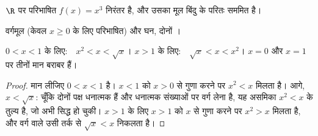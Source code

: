 \begin{proposition}[घन फलन]\label{prop:g10:reffunc:cube}
$\R$ पर परिभाषित  $f(x) = x^3$ निरंतर  है, और उसका  मूल बिंदु के
परितः सममित है।
\end{proposition}
\admitted

\begin{omfigure}
\hfill
{}

{\small वर्गमूल (केवल $x \geq 0$ के लिए परिभाषित) और घन, दोनों ।}
\end{omfigure}

\begin{proposition}[$x$, $x^2$ और $\sqrt x$ की तुलना]\label{prop:g10:reffunc:compare}
$0 < x < 1$ के लिए:\ \ $x^2 < x < \sqrt x$।\quad
$x > 1$ के लिए:\ \ $\sqrt x < x < x^2$।\quad
$x = 0$ और $x = 1$ पर तीनों मान बराबर हैं।
\end{proposition}

\begin{proof}
मान लीजिए $0 < x < 1$ है। $x < 1$ को $x > 0$ से गुणा करने पर $x^2 < x$ मिलता है। आगे,
$x < \sqrt x$: चूँकि दोनों पक्ष धनात्मक हैं और धनात्मक संख्याओं पर वर्ग लेना 
है, यह असमिका $x^2 < x$ के तुल्य है, जो अभी सिद्ध हो चुकी। $x > 1$ के लिए $x > 1$
को $x$ से गुणा करने पर $x^2 > x$ मिलता है, और वर्ग वाले उसी तर्क से $\sqrt x < x$
निकलता है।
\end{proof}

